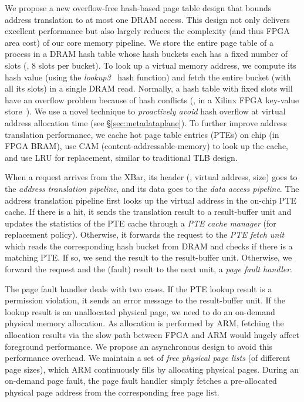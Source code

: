 We propose a new overflow-free hash-based page table design that bounds address translation to at most one DRAM access.
This design not only delivers excellent performance 
but also largely reduces the complexity (and thus FPGA area cost) of our core memory pipeline. %
We store the entire page table of a process in a DRAM hash table whose hash buckets each has a fixed number of slots (\eg, 8 slots per bucket).
To look up a virtual memory address, we compute its hash value (using the {\em lookup3}~\cite{lookup3-wiki} hash function) 
and fetch the entire bucket (with all its slots) in a single DRAM read.
Normally, a hash table with fixed slots will have an overflow problem because of hash conflicts (\eg, in a Xilinx FPGA key-value store~\cite{FPGA-KV}).
We use a novel technique to {\em proactively avoid} hash overflow at virtual address allocation time (see \S\ref{sec:metadataplane}).
To further improve address translation performance, we cache hot page table entries (PTEs) on chip (in FPGA BRAM),
use CAM (content-addressable-memory) to look up the cache,
and use LRU for replacement, similar to traditional TLB design.

When a request arrives from the XBar, its header (\pid, virtual address, size) goes to the {\em address translation pipeline},
and its data goes to the {\em data access pipeline}.
The address translation pipeline first looks up the virtual address in the on-chip PTE cache.
If there is a hit, it sends the translation result to a result-buffer unit
and updates the statistics of the PTE cache through a {\em PTE cache manager} (for replacement policy).
Otherwise, it forwards the request to the {\em PTE fetch unit} which reads the corresponding hash bucket from DRAM
and checks if there is a matching PTE.
If so, we send the result to the result-buffer unit.
Otherwise, we forward the request and the (fault) result to the next unit,
a {\em page fault handler}.

The page fault handler deals with two cases.
If the PTE lookup result is a permission violation, it sends an error message to the result-buffer unit.
If the lookup result is an unallocated physical page, we need to do an on-demand physical memory allocation.
As allocation is performed by ARM, fetching the allocation results via the slow path between FPGA and ARM would hugely affect foreground performance.
We propose an asynchronous design to avoid this performance overhead.
We maintain a set of {\em free physical page lists} (of different page sizes),
which ARM continuously fills by allocating physical pages. %
During an on-demand page fault, the page fault handler simply fetches a pre-allocated physical page address 
from the corresponding free page list. %

